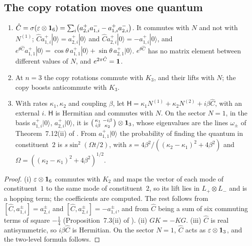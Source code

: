 \subsection{The copy rotation moves one quantum}
\label{e2:sec:hop}

\begin{proposition}
\label{e2:prop:hop}
\begin{enumerate}[label=(\roman*),leftmargin=2.2em]
\item $\hat C=\sigma(\varepsilon\otimes\mathbf 1_6)=\sum_i\bigl(a^+_{2,i}a^-_{1,i}-a^+_{1,i}a^-_{2,i}\bigr)$. It commutes with $N$ and not with $N^{(1)}$;
$\hat Ca^+_{1,i}|0\rangle=a^+_{2,i}|0\rangle$ and $\hat Ca^+_{2,i}|0\rangle=-a^+_{1,i}|0\rangle$, and
$e^{\theta\hat C}a^+_{1,1}|0\rangle=\cos\theta\,a^+_{1,1}|0\rangle+\sin\theta\,a^+_{2,1}|0\rangle$. $e^{\theta\hat C}$ has no matrix element between different values
of $N$, and $e^{2\pi\hat C}=\mathbf 1$.
\item At $n=3$ the copy rotations commute with $K_3$, and their lifts with $N$; the copy boosts anticommute with $K_3$.
\item With rates $\kappa_1,\kappa_2$ and coupling $\beta$, let $\mathsf H=\kappa_1N^{(1)}+\kappa_2N^{(2)}+i\beta\hat C$, with an external $i$. $\mathsf H$ is
Hermitian and commutes with $N$. On the sector $N=1$, in the basis $a^+_{1,i}|0\rangle$, $a^+_{2,i}|0\rangle$, it is
$\bigl(\begin{smallmatrix}\kappa_1&-i\beta\\ i\beta&\kappa_2\end{smallmatrix}\bigr)\otimes\mathbf 1_3$, whose eigenvalues are the lines $\omega_\pm$ of
Theorem~7.12(ii) of \cite{RE}. From $a^+_{1,1}|0\rangle$ the probability of finding the quantum in constituent~$2$ is
$s\sin^2(\Omega t/2)$, with $s=4\beta^2/((\kappa_2-\kappa_1)^2+4\beta^2)$ and $\Omega=((\kappa_2-\kappa_1)^2+4\beta^2)^{1/2}$.
\end{enumerate}
\end{proposition}

\begin{proof}
(i) $\varepsilon\otimes\mathbf 1_6$ commutes with $K_2$ and maps the vector of each mode of constituent~$1$ to the same mode of constituent~$2$, so its
lift lies in $L_+\otimes L_-$ and is a hopping term; the coefficients are computed. The rest follows from $[\hat C,a^\pm_{1,i}]=a^\pm_{2,i}$ and
$[\hat C,a^\pm_{2,i}]=-a^\pm_{1,i}$, and from $\hat C$ being a sum of six commuting terms of square $-\tfrac14$ (Proposition~7.3(ii) of \cite{RE}). (ii)
$GK=-KG$. (iii) $\hat C$ is real antisymmetric, so $i\beta\hat C$ is Hermitian. On the sector $N=1$, $\hat C$ acts as $\varepsilon\otimes\mathbf 1_3$, and the
two-level formula follows.
\end{proof}


